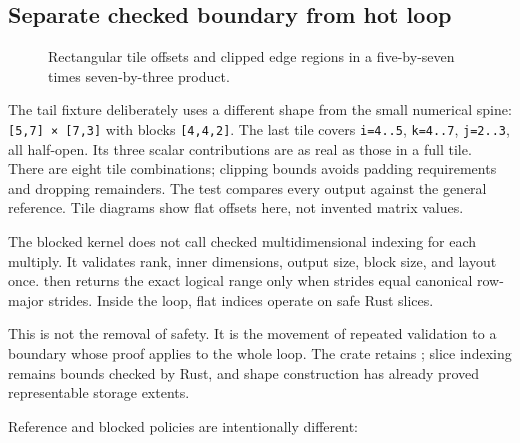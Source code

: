 \documentclass[
  10pt,
]{article}
\begin{document}
\subsection{Separate checked boundary from hot
loop}\label{separate-checked-boundary-from-hot-loop}

\begin{figure}[H]\centering\resizebox{\linewidth}{!}{}\caption{Rectangular tile offsets and clipped edge regions in a five-by-seven times seven-by-three product.}\end{figure}

The tail fixture deliberately uses a different shape from the small
numerical spine: \texttt{{[}5,7{]}\ ×\ {[}7,3{]}} with blocks
\texttt{{[}4,4,2{]}}. The last tile covers \texttt{i=4..5},
\texttt{k=4..7}, \texttt{j=2..3}, all half-open. Its three scalar
contributions are as real as those in a full tile. There are eight tile
combinations; clipping bounds avoids padding requirements and dropping
remainders. The test compares every output against the general
reference. Tile diagrams show flat offsets here, not invented matrix
values.

The blocked kernel does not call checked multidimensional indexing for
each multiply. It validates rank, inner dimensions, output size, block
size, and layout once.
\texttt{} then returns the
exact logical range only when strides equal canonical row-major strides.
Inside the loop, flat indices operate on safe Rust slices.

This is not the removal of safety. It is the movement of repeated
validation to a boundary whose proof applies to the whole loop. The
crate retains \texttt{}; slice
indexing remains bounds checked by Rust, and shape construction has
already proved representable storage extents.

Reference and blocked policies are intentionally different:

\end{document}
